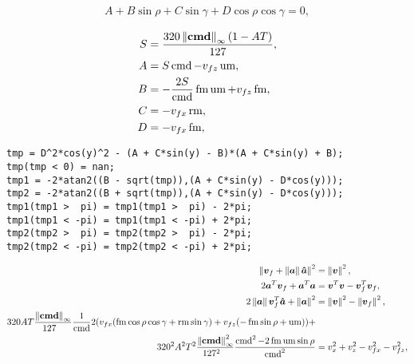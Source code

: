 \begin{align}
\label{eq:ABCD}
A + B\sin\rho + C\sin\gamma + D\cos\rho\cos\gamma = 0,
\end{align}

\begin{align*}
S &= \frac{320\left\lVert\boldsymbol{\operatorname{cmd}}\right\rVert_{\infty}(1-AT)}{127},\\
A &= S\operatorname{cmd}         - v_{fz}\operatorname{um},\\
B &= -\frac{2S}{\operatorname{cmd}}\operatorname{fm}\operatorname{um} + v_{fz}\operatorname{fm},\\
C &= -v_{fx}\operatorname{rm},\\
D &= -v_{fx}\operatorname{fm},
\end{align*}

\begin{verbatim}
tmp = D^2*cos(y)^2 - (A + C*sin(y) - B)*(A + C*sin(y) + B);
tmp(tmp < 0) = nan;
tmp1 = -2*atan2((B - sqrt(tmp)),(A + C*sin(y) - D*cos(y)));
tmp2 = -2*atan2((B + sqrt(tmp)),(A + C*sin(y) - D*cos(y)));
tmp1(tmp1 >  pi) = tmp1(tmp1 >  pi) - 2*pi;
tmp1(tmp1 < -pi) = tmp1(tmp1 < -pi) + 2*pi;
tmp2(tmp2 >  pi) = tmp2(tmp2 >  pi) - 2*pi;
tmp2(tmp2 < -pi) = tmp2(tmp2 < -pi) + 2*pi;
\end{verbatim}

\begin{align*}
\norm{\vec{v}_f + \norm{\vec{a}}\uvec{a}}^2 &= \norm{\vec{v}}^2,\\
2\vec{a}^T \vec{v}_f + \vec{a}^T \vec{a} &= \vec{v}^T \vec{v} - \vec{v}_f^T \vec{v}_f,\\
2\norm{\vec{a}} \vec{v}_f^T \uvec{a} + \norm{\vec{a}}^2 &= \norm{\vec{v}}^2 - \norm{\vec{v}_f}^2,\\
320AT\frac{\norm{\vec{\cmd}}_{\infty}}{127\hphantom{_{\infty}}} \frac{1}{\cmd}2 (v_{fx}(\fmove \cos\rho\cos\gamma + \rmove \sin\gamma) + v_{fz}(-\fmove \sin\rho + \umove) ) +\\
320^2 A^2 T^2\frac{\norm{\vec{\cmd}}^2_{\infty}}{127^2\hphantom{_{\infty}}} \frac{\cmd^2  - 2\fmove\umove\sin\rho}{\cmd^2} &= v_x^2 + v_z^2 - v_{fx}^2 - v_{fz}^2,
\end{align*}

